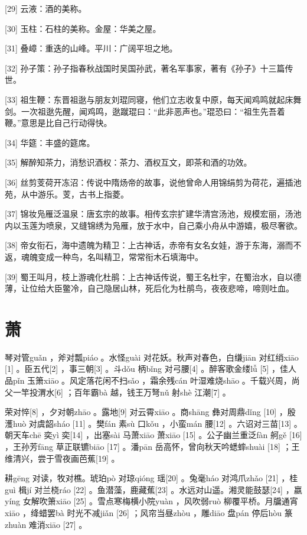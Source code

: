 \documentclass[12pt,UTF8]{ctexbook}
\begin{document}
[29] 云液：酒的美称。

[30] 玉柱：石柱的美称。金屋：华美之屋。

[31] 叠嶂：重迭的山峰。平川：广阔平坦之地。

[32] 孙子策：孙子指春秋战国时吴国孙武，著名军事家，著有《孙子》十三篇传世。

[33] 祖生鞭：东晋祖逖与朋友刘琨同寝，他们立志收复中原，每天闻鸡鸣就起床舞剑。一次祖逖先醒，闻鸡鸣，逖蹴琨曰：“此非恶声也。”琨恐曰：“祖生先吾着鞭。”意思是比自己行动得快。

[34] 华筵：丰盛的筵席。

[35] 解醉知茶力，消愁识酒权：茶力、酒权互文，即茶和酒的功效。

[36] 丝剪芰荷开冻沼：传说中隋炀帝的故事，说他曾命人用锦绢剪为荷花，遍插池苑，从中游乐。芰，古书上指菱。

[37] 锦妆凫雁泛温泉：唐玄宗的故事。相传玄宗扩建华清宫汤池，规模宏丽，汤池内以玉莲为喷泉，又缝锦绣为凫雁，放于水中，自己乘小舟从中游嬉，极尽奢欲。

[38] 帝女衔石，海中遗魄为精卫：上古神话，赤帝有女名女娃，游于东海，溺而不返，魂魄变成一种鸟，名叫精卫，常常衔木石填海中。

[39] 蜀王叫月，枝上游魂化杜鹃：上古神话传说，蜀王名杜宇，在蜀治水，自以德薄，让位给大臣鳖冷，自己隐居山林，死后化为杜鹃鸟，夜夜悲啼，啼则吐血。





\chapter{萧}


琴对管guǎn ，斧对瓢piáo 。水怪guài 对花妖。秋声对春色，白缣jiān 对红绡xiāo [1] 。臣五代[2] ，事三朝[3] 。斗dǒu 柄bǐng 对弓腰[4] 。醉客歌金缕lǚ [5] ，佳人品pǐn 玉箫xiāo 。风定落花闲不扫sǎo ，霜余残cán 叶湿难烧shāo 。千载兴周，尚父一竿投渭水[6] ；百年霸bà 越，钱王万弩nǔ 射shè 江潮[7] 。

荣对悴[8] ，夕对朝zhāo 。露地[9] 对云霄xiāo 。商shāng 彝对周鼎dǐng [10] ，殷濩huò 对虞韶sháo [11] 。樊fán 素sù 口kǒu ，小蛮mán 腰[12] 。六诏对三苗[13] 。朝天车chē 奕yì 奕[14] ，出塞sài 马萧xiāo 萧xiāo [15] 。公子幽兰重泛fàn 舸gě [16] ，王孙芳fāng 草正联镳biāo [17] 。潘pān 岳高怀，曾向秋天吟蟋蟀shuài [18] ；王维清兴，尝于雪夜画芭蕉[19] 。

耕gēng 对读，牧对樵。琥珀pò 对琼qióng 瑶[20] 。兔毫háo 对鸿爪zhǎo [21] ，桂guì 楫jí 对兰桡ráo [22] 。鱼潜藻，鹿藏蕉[23] 。水远对山遥。湘灵能鼓瑟[24] ，嬴yíng 女解吹箫xiāo [25] 。雪点寒梅横小院yuàn ，风吹弱ruò 柳覆平桥。月牖通宵xiāo ，绛蜡罢bà 时光不减jiǎn [26] ；风帘当昼zhòu ，雕diāo 盘pán 停后hòu 篆zhuàn 难消xiāo [27] 。
\end{document}
